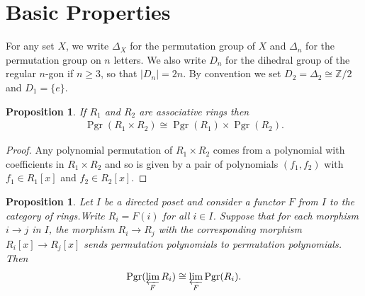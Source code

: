 \documentclass[oneside]{amsart}
\theoremstyle{nthm}
\newtheorem{prop}[subsection]{Proposition}
\theoremstyle{ndef}
\theoremstyle{nrem}
\newcommand{\Z}{\mathbb{Z}}
\DeclareMathOperator{\Pgr}{Pgr}
\begin{document}
\section{Basic Properties}\label{sec:basic_props}
For any set $X$, we write $\Delta_X$ for the permutation group of $X$ and $\Delta_n$ for the permutation group on $n$ letters. We also write $D_n$ for the dihedral group of the regular $n$-gon if $n \geq 3$, so that $|D_n| = 2n$. By convention we set $D_2 = \Delta_2 \cong \Z/2$ and $D_1 = \{ e\}$.
\begin{prop}\label{thm:behaviourUnderProducts}
    If $R_1$ and $R_2$ are associative rings then
    \begin{align*}
        \Pgr(R_1\times R_2) \cong \Pgr(R_1)\times\Pgr(R_2).
    \end{align*}
\end{prop}
\begin{proof}
    Any polynomial permutation of $R_1\times R_2$ comes from a polynomial with coefficients in $R_1\times R_2$ and so is given by a pair of polynomials $(f_1,f_2)$ with $f_1\in R_1[x]$ and $f_2\in R_2[x]$.
\end{proof}
\begin{prop}\label{thm:projlimits}
    Let $I$ be a directed poset and consider a functor $F$ from $I$ to the category of rings.Write $R_i = F(i)$ for all $i\in I$. Suppose that for each morphism $i\to j$ in $I$, the morphism $R_i\to R_j$ with the corresponding morphism $R_i[x]\to R_j[x]$ sends permutation polynomials to permutation polynomials. Then
    \begin{align*}
        \Pgr(\varprojlim_F R_i) \cong \varprojlim_F \Pgr(R_i).
    \end{align*}
\end{prop}
\end{document}
